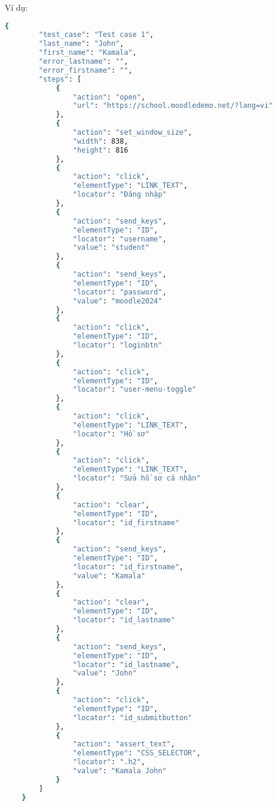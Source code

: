 Ví dụ:
\begin{lstlisting}[language=bash, caption={Ví dụ testcase ESN-001-0001 ở level 2}, breaklines=true]
    {
        "test_case": "Test case 1",
        "last_name": "John",
        "first_name": "Kamala",
        "error_lastname": "",
        "error_firstname": "",
        "steps": [
            {
                "action": "open",
                "url": "https://school.moodledemo.net/?lang=vi"
            },
            {
                "action": "set_window_size",
                "width": 838,
                "height": 816
            },
            {
                "action": "click",
                "elementType": "LINK_TEXT",
                "locator": "Đăng nhập"
            },
            {
                "action": "send_keys",
                "elementType": "ID",
                "locator": "username",
                "value": "student"
            },
            {
                "action": "send_keys",
                "elementType": "ID",
                "locator": "password",
                "value": "moodle2024"
            },
            {
                "action": "click",
                "elementType": "ID",
                "locator": "loginbtn"
            },
            {
                "action": "click",
                "elementType": "ID",
                "locator": "user-menu-toggle"
            },
            {
                "action": "click",
                "elementType": "LINK_TEXT",
                "locator": "Hồ sơ"
            },
            {
                "action": "click",
                "elementType": "LINK_TEXT",
                "locator": "Sửa hồ sơ cá nhân"
            },
            {
                "action": "clear",
                "elementType": "ID",
                "locator": "id_firstname"
            },
            {
                "action": "send_keys",
                "elementType": "ID",
                "locator": "id_firstname",
                "value": "Kamala"
            },
            {
                "action": "clear",
                "elementType": "ID",
                "locator": "id_lastname"
            },
            {
                "action": "send_keys",
                "elementType": "ID",
                "locator": "id_lastname",
                "value": "John"
            },
            {
                "action": "click",
                "elementType": "ID",
                "locator": "id_submitbutton"
            },
            {
                "action": "assert_text",
                "elementType": "CSS_SELECTOR",
                "locator": ".h2",
                "value": "Kamala John"
            }
        ]
    }
\end{lstlisting}
